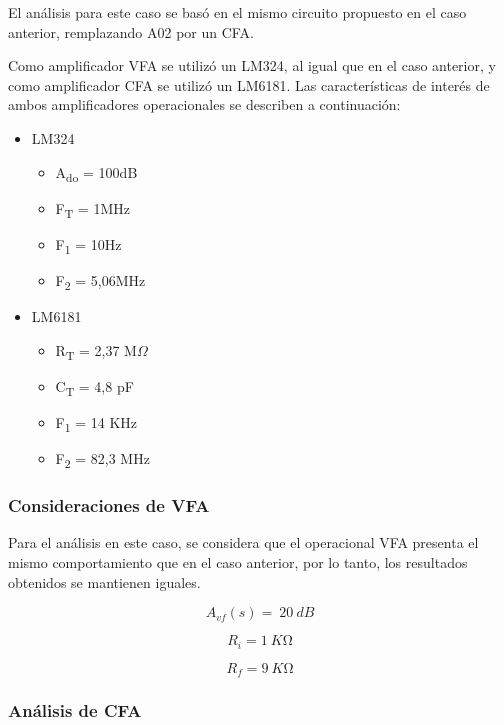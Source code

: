 \documentclass[12pt,a4paper]{article}
\begin{document}
El análisis para este caso se basó en el mismo circuito propuesto en el
caso anterior, remplazando A02 por un CFA.

Como amplificador VFA se utilizó un LM324, al igual que en el caso
anterior, y como amplificador CFA se utilizó un LM6181. Las
características de interés de ambos amplificadores operacionales se
describen a continuación:

\begin{itemize}
\item
  LM324

  \begin{itemize}
  \item
    A\textsubscript{do} = 100dB
  \item
    F\textsubscript{T} = 1MHz
  \item
    F\textsubscript{1} = 10Hz
  \item
    F\textsubscript{2} = 5,06MHz
  \end{itemize}
\item
  LM6181

  \begin{itemize}
  \item
    R\textsubscript{T} = 2,37 M\ensuremath{\Omega}
  \item
    C\textsubscript{T} = 4,8 pF
  \item
    F\textsubscript{1} = 14 KHz
  \item
    F\textsubscript{2} = 82,3 MHz
  \end{itemize}
\end{itemize}

\subsubsection{Consideraciones de VFA}\label{consideraciones-de-vfa}

Para el análisis en este caso, se considera que el operacional VFA
presenta el mismo comportamiento que en el caso anterior, por lo tanto,
los resultados obtenidos se mantienen iguales.

\[A_{vf}(s) = \ 20\ dB\]

\[R_{i} = 1\ K\mathrm{\Omega}\]

\[R_{f} = 9\ K\mathrm{\Omega}\]

\subsubsection{Análisis de CFA}\label{anuxe1lisis-de-cfa}
\end{document}

